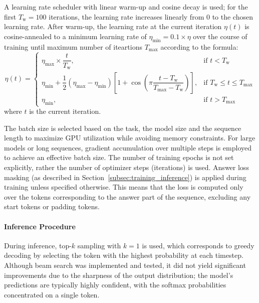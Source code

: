 A learning rate scheduler with linear warm-up and cosine decay is used; for the first $T_{\text{w}} = 100$ iterations, the learning rate increases linearly from $0$ to the chosen learning rate. After warm-up, the learning rate at the current iteration $\eta(t)$ is cosine-annealed to a minimum learning rate of $\eta_{\text{min}} = 0.1 \times \eta$ over the course of training until maximum number of iteartions $T_{\text{max}}$ according to the formula:
\[
    \eta(t) =
    \begin{cases}
        \eta_{\text{max}} \times \dfrac{t}{T_{\text{w}}},                                                                                                                          & \text{if } t < T_{\text{w}}                        \\
        \eta_{\text{min}} + \dfrac{1}{2} (\eta_{\text{max}} - \eta_{\text{min}}) \left[1 + \cos\left( \pi \dfrac{t - T_{\text{w}}}{T_{\text{max}} - T_{\text{w}}} \right) \right], & \text{if } T_{\text{w}} \leq t \leq T_{\text{max}} \\
        \eta_{\text{min}},                                                                                                                                                         & \text{if } t > T_{\text{max}}
    \end{cases}
\]
where $t$ is the current iteration.

The batch size is selected based on the task, the model size and the sequence length to maximize GPU utilization while avoiding memory constraints. For large models or long sequences, gradient accumulation over multiple steps is employed to achieve an effective batch size. The number of training epochs is not set explicitly, rather the number of optimizer steps (iterations) is used. Answer loss masking (as described in Section~\ref{subsec:training_inference}) is applied during training unless specified otherwise. This means that the loss is computed only over the tokens corresponding to the answer part of the sequence, excluding any start tokens or padding tokens.

\paragraph{Inference Procedure}
During inference, top-$k$ sampling with $k=1$ is used, which corresponds to greedy decoding by selecting the token with the highest probability at each timestep. Although beam search was implemented and tested, it did not yield significant improvements due to the sharpness of the output distribution; the model's predictions are typically highly confident, with the softmax probabilities concentrated on a single token.

